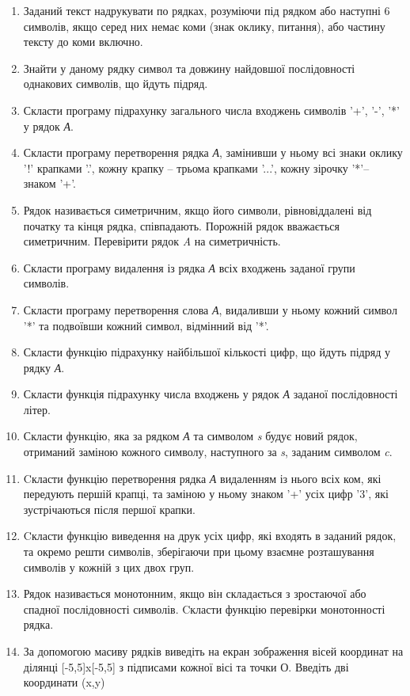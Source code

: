 \documentclass[]{article}
\makeatletter
\newcommand{\xslalph}[1]{\expandafter\@xslalph\csname c@#1\endcsname}
\newcommand{\@xslalph}[1]{%
    \ifcase#1\or а\or б\or в\or г\or д\or e\or є\or ж\or з\or i%
    \or й\or к\or л\or м\or н\or о\or п\or р\or с\or т%
    \or у\or ф\or х\or ц\or ч\or ш\or ю\or я\or аа\or бб\or вв%
    \else\@ctrerr\fi%
}
\makeatother
\begin{document}
\begin{enumerate}
\begin{enumerate}[label=\xslalph*)]
\begin{enumerate}
\begin{enumerate}[label=\xslalph*)]
\begin{enumerate}
\item
  Заданий текст надрукувати по рядках, розуміючи під рядком або наступні
  6 символів, якщо серед них немає коми (знак оклику, питання), або
  частину тексту до коми включно.
\item
  Знайти у даному рядку символ та довжину найдовшої послідовності
  однакових символів, що йдуть підряд.
\item
  Скласти програму підрахунку загального числа входжень символів '+',
  '-', '*' у рядок \emph{А}.
\item
  Скласти програму перетворення рядка \emph{А}, замінивши у ньому всі
  знаки оклику '!' крапками '.', кожну крапку -- трьома крапками '...',
  кожну зірочку '*'-- знаком '+'.
\item
  Рядок називається симетричним, якщо його символи, рівновіддалені від
  початку та кінця рядка, співпадають. Порожній рядок вважається
  симетричним. Перевірити рядок \emph{A} на симетричність.
\item
  Скласти програму видалення із рядка \emph{А} всіх входжень заданої
  групи символів.
\item
  Скласти програму перетворення слова \emph{А}, видаливши у ньому кожний
  символ '*' та подвоївши кожний символ, відмінний від '*'.
\item
  Скласти функцію підрахунку найбільшої кількості цифр, що йдуть підряд
  у рядку \emph{А}.
\item
  Скласти функція підрахунку числа входжень у рядок \emph{А} заданої
  послідовності літер.
\item
  Скласти функцію, яка за рядком \emph{А} та символом \emph{s} будує
  новий рядок, отриманий заміною кожного символу, наступного за
  \emph{s}, заданим символом \emph{c}.
\item
  Cкласти функцію перетворення рядка \emph{А} видаленням із нього всіх
  ком, які передують першій крапці, та заміною у ньому знаком '+' усіх
  цифр '3', які зустрічаються після першої крапки.
\item
  Cкласти функцію виведення на друк усіх цифр, які входять в заданий
  рядок, та окремо решти символів, зберігаючи при цьому взаємне
  розташування символів у кожній з цих двох груп.
\item
  Рядок називається монотонним, якщо він складається з зростаючої або
  спадної послідовності символів. Cкласти функцію перевірки
  монотонності рядка.
\item
За допомогою масиву рядків виведіть на екран зображення вісей координат на ділянці
[-5,5]x[-5,5] з підписами кожної вісі та точки О. Введіть дві координати (x,y) 

\end{enumerate}
\end{enumerate}
\end{enumerate}
\end{enumerate}
\end{enumerate}
\end{document}

